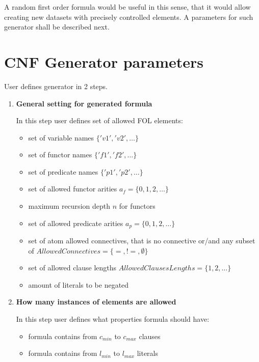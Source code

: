 A random first order formula would be useful in this sense, that it would allow creating new datasets with precisely controlled elements. A parameters for such generator shall be described next.

\section{CNF Generator parameters}

User defines generator in 2 steps.

\begin{enumerate}
  \item \textbf{General setting for generated formula}

    In this step user defines set of allowed \gls{FOL} elements:
    \begin{itemize}
      \item set of variable names $\{'v1','v2',\dots\}$
      \item set of functor names $\{'f1','f2',\dots\}$
      \item set of predicate names $\{'p1','p2',\dots\}$
      \item set of allowed functor arities $a_f = \{0, 1, 2,\dots\}$
      \item maximum recursion depth $n$ for functors
      \item set of allowed predicate arities $a_p = \{0, 1, 2,\dots\}$
      \item set of atom allowed connectives, that is no connective or/and any subset of $AllowedConnectives = \{=, !=, \emptyset\}$
      \item set of allowed clause lengths $AllowedClausesLengths = \{1,2,\dots\}$
      \item amount of literals to be negated
    \end{itemize}

  \item \textbf{How many instances of elements are allowed}

    In this step user defines what properties formula should have:
    \begin{itemize}
      \item formula contains from $c_{min}$ to $c_{max}$ clauses
      \item formula contains from $l_{min}$ to $l_{max}$ literals
    \end{itemize}

\end{enumerate}

